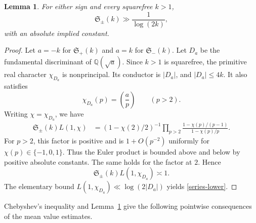 \documentclass[12pt,reqno]{amsart}
\numberwithin{equation}{section}
\theoremstyle{plain}
\newtheorem{lemma}[theorem]{Lemma}
\theoremstyle{remark}
\begin{document}
\begin{lemma}\label{lem:series-lower}
For either sign and every squarefree $k>1$,
\begin{equation}\label{series-lower}
 \mathfrak S_\pm(k)\gg\frac1{\log(2k)},
\end{equation}
with an absolute implied constant.
\end{lemma}

\begin{proof}
Let $a=-k$ for $\mathfrak S_+(k)$ and $a=k$ for
$\mathfrak S_-(k)$.  Let $D_a$ be the fundamental discriminant of
$\mathbb Q(\sqrt a)$.  Since $k>1$ is squarefree, the primitive real
character $\chi_{D_a}$ is nonprincipal.  Its conductor is $|D_a|$,
and $|D_a|\leq4k$.  It also satisfies
\[
 \chi_{D_a}(p)=\left(\frac ap\right)
 \qquad(p>2).
\]
Writing $\chi=\chi_{D_a}$, we have
\begin{align*}
 \mathfrak S_\pm(k)L(1,\chi)
 &=(1-\chi(2)/2)^{-1}
 \prod_{p>2}
 \frac{1-\chi(p)/(p-1)}{1-\chi(p)/p}.
\end{align*}
For $p>2$, this factor is positive and is
$1+O(p^{-2})$ uniformly for $\chi(p)\in\{-1,0,1\}$.  Thus the Euler
product is bounded above and below by positive absolute constants.
The same holds for the factor at $2$.  Hence
\[
 \mathfrak S_\pm(k)L(1,\chi_{D_a})\asymp1.
\]
The elementary bound $L(1,\chi_{D_a})\ll\log(2|D_a|)$ yields
\eqref{series-lower}.
\end{proof}

Chebyshev's inequality and Lemma~\ref{lem:series-lower} give the
following pointwise consequences of the mean value estimates.
\end{document}

